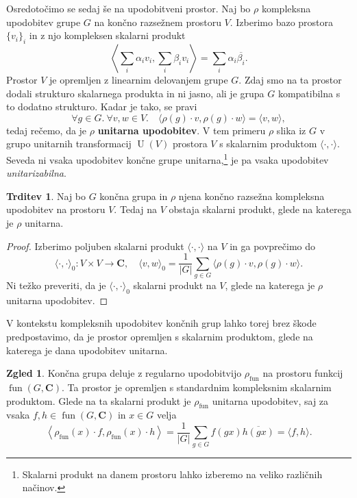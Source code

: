 \documentclass[11pt]{book}
\def\CC{\mathbf{C}}
\DeclareMathOperator\fun{fun}
\DeclareMathOperator\U{U}
\def\definicija{\color{rdeca}\bf}
\theoremstyle{definition}
\theoremstyle{zgled}
\newtheorem{zgled}[theorem]{Zgled}
\theoremstyle{zgledbrezstevilke}
\theoremstyle{odprtproblem}
\theoremstyle{domacanaloga}
\newenvironment{dokaz}
    {\color{siva}\begin{proof}}
    {\end{proof}}
\theoremstyle{izrek}
\newtheorem{trditev}[theorem]{Trditev}
\begin{document}
Osredotočimo se sedaj še na upodobitveni prostor. Naj bo $\rho$ kompleksna upodobitev grupe $G$ na končno razsežnem prostoru $V$. Izberimo bazo prostora $\{ v_i \}_{i}$ in z njo kompleksen skalarni produkt
\[
    \left\langle \sum_i \alpha_i v_i, \sum_i \beta_i v_i \right\rangle = \sum_i \alpha_i \overline{\beta_i}.
\]
Prostor $V$ je opremljen z linearnim delovanjem grupe $G$. Zdaj smo na ta prostor dodali strukturo skalarnega produkta in ni jasno, ali je grupa $G$ kompatibilna s to dodatno strukturo. Kadar je tako, se pravi
\[
    \forall g \in G. \ \forall v, w \in V. \quad \langle \rho(g) \cdot v, \rho(g) \cdot w \rangle = \langle v, w \rangle,
\]
tedaj rečemo, da je $\rho$ {\definicija unitarna upodobitev}. V tem primeru $\rho$ slika iz $G$ v grupo unitarnih transformacij $\U(V)$ prostora $V$ s skalarnim produktom $\langle \cdot, \cdot \rangle$. Seveda ni vsaka upodobitev končne grupe unitarna,\footnote{Skalarni produkt na danem prostoru lahko izberemo na veliko različnih načinov.} je pa vsaka upodobitev \emph{unitarizabilna}.

\begin{trditev}
Naj bo $G$ končna grupa in $\rho$ njena končno razsežna kompleksna upodobitev na prostoru $V$. Tedaj na $V$ obstaja skalarni produkt, glede na katerega je $\rho$ unitarna.
\end{trditev}
\begin{dokaz}
Izberimo poljuben skalarni produkt $\langle \cdot, \cdot \rangle$ na $V$ in ga povprečimo do
\[
    \langle \cdot, \cdot \rangle_0 \colon V \times V \to \CC, \quad
    \langle v, w \rangle_0 = \frac{1}{|G|} \sum_{g \in G} \langle \rho(g) \cdot v, \rho(g) \cdot w \rangle.
\]
Ni težko preveriti, da je $\langle \cdot, \cdot \rangle_0$ skalarni produkt na $V$, glede na katerega je $\rho$ unitarna upodobitev.
\end{dokaz}

V kontekstu kompleksnih upodobitev končnih grup lahko torej brez škode predpostavimo, da je prostor opremljen s skalarnim produktom, glede na katerega je dana upodobitev unitarna.

\begin{zgled}
Končna grupa deluje z regularno upodobitvijo $\rho_{\fun}$ na prostoru funkcij $\fun(G, \CC)$. Ta prostor je opremljen s standardnim kompleksnim skalarnim produktom. Glede na ta skalarni produkt je $\rho_{\fun}$ unitarna upodobitev, saj za vsaka $f,h \in \fun(G,\CC)$ in $x \in G$ velja
\[
    \left\langle \rho_{\fun}(x) \cdot f, \rho_{\fun}(x) \cdot h  \right\rangle =
    \frac{1}{|G|} \sum_{g \in G} f(gx) \overline{h(gx)}
    = \langle f, h \rangle.
\]
\end{zgled}
\end{document}
